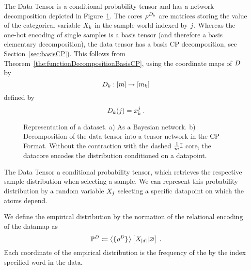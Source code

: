 The Data Tensor is a conditional probability tensor and has a network decomposition depicted in Figure~\ref{fig:DataDecomposition}.
The cores $\rho^{D_{k}}$ are matrices storing the value of the categorical variable $X_{k}$ in the sample world indexed by $j$.
Whereas the one-hot encoding of single samples is a basis tensor (and therefore a basis elementary decomposition), the data tensor has a basis CP decomposition, see Section~\ref{sec:basisCP}).
This follows from Theorem~\ref{the:functionDecompositionBasisCP}, using the coordinate maps of $D$ by
	\[ D_{k} : [m] \rightarrow [m_{k}] \]
defined by
	\[  D_{k}(j) = x_{k}^j \, .  \]

\begin{figure}[h]\label{fig:}
\begin{center}
	
\end{center}
\caption{
	Representation of a dataset.
	a) As a Bayesian network.
	b) Decomposition of the data tensor into a tensor network in the $\mathrm{CP}$ Format.
	Without the contraction with the dashed $\frac{1}{m}\mathbb{I}$ core, the datacore encodes the distribution conditioned on a datapoint. }
\label{fig:DataDecomposition}
\end{figure}


The Data Tensor a conditional probability tensor, which retrieves the respective sample distribution when selecting a sample.
We can represent this probability distribution by a random variable $X_{j}$ selecting a specific datapoint on which the atoms depend.

We define the empirical distribution by the normation of the relational encoding of the datamap as
\begin{align*}
	\mathbb{P}^{D} 
	\coloneqq \left\langle \{\rho^{D}\}\right\rangle \left[ X_{[d]} | \varnothing \right] \, . 
\end{align*}
Each coordinate of the empirical distribution is the frequency of the by the index specified word in the data.

